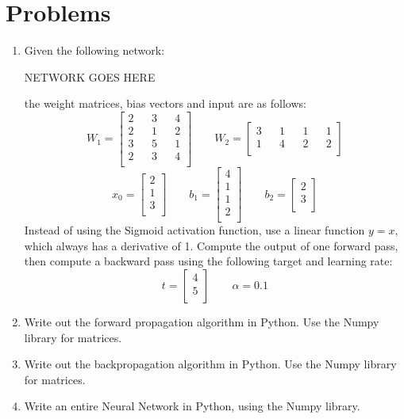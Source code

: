 \documentclass{article}
\begin{document}
\section{Problems}
\begin{enumerate}
    \item Given the following network:

    NETWORK GOES HERE

    the weight matrices, bias vectors and input are as follows:
    \[W_1 =
    \begin{bmatrix}
        2 && 3 && 4 \\
        2 && 1 && 2 \\
        3 && 5 && 1 \\
        2 && 3 && 4 \\
    \end{bmatrix}
    \qquad
    W_2 =
    \begin{bmatrix}
        3 && 1 && 1 && 1\\
        1 && 4 && 2 && 2\\
    \end{bmatrix}
    \]
    \[x_0 =
    \begin{bmatrix}
        2 \\
        1 \\
        3 \\
    \end{bmatrix}
    \qquad
    b_1 =
    \begin{bmatrix}
        4 \\
        1 \\
        1 \\
        2 \\
    \end{bmatrix}
    \qquad
    b_2 =
    \begin{bmatrix}
        2 \\
        3 \\
    \end{bmatrix}
    \]
    Instead of using the Sigmoid activation function, use a linear function $y=x$, which always has a derivative of 1. Compute the output of one forward pass, then compute a backward pass using the following target and learning rate:
    \[
        t =
    \begin{bmatrix}
        4 \\
        5 \\
    \end{bmatrix}
    \qquad
    \alpha = 0.1
    \]
    \item Write out the forward propagation algorithm in Python. Use the Numpy library for matrices.
    \item Write out the backpropagation algorithm in Python. Use the Numpy library for matrices.
    \item Write an entire Neural Network in Python, using the Numpy library.
\end{enumerate}
\end{document}
